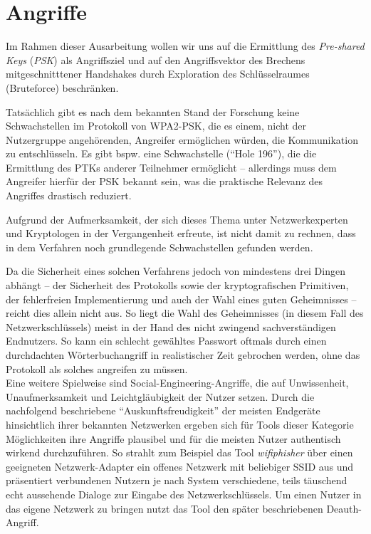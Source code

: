 \section{Angriffe}
Im Rahmen dieser Ausarbeitung wollen wir uns auf die Ermittlung des \textit{Pre-shared Keys} (\textit{PSK}) als Angriffsziel und auf den Angriffsvektor des Brechens mitgeschnitttener Handshakes durch Exploration des Schlüsselraumes (Bruteforce) beschränken.

Tatsächlich gibt es nach dem bekannten Stand der Forschung keine Schwachstellen im Protokoll von WPA2-PSK, die es einem, nicht der Nutzergruppe angehörenden, Angreifer ermöglichen würden, die Kommunikation zu entschlüsseln. Es gibt bspw. eine Schwachstelle (\enquote{Hole 196}), die die Ermittlung des PTKs anderer Teilnehmer ermöglicht -- allerdings muss dem Angreifer hierfür der PSK bekannt sein, was die praktische Relevanz des Angriffes drastisch reduziert.

Aufgrund der Aufmerksamkeit, der sich dieses Thema unter Netzwerkexperten und Kryptologen in der Vergangenheit erfreute, ist nicht damit zu rechnen, dass in dem Verfahren noch grundlegende Schwachstellen gefunden werden. 

Da die Sicherheit eines solchen Verfahrens jedoch von mindestens drei Dingen abhängt -- der Sicherheit des Protokolls sowie der kryptografischen Primitiven, der fehlerfreien Implementierung und auch der Wahl eines guten Geheimnisses -- reicht dies allein nicht aus. 
So liegt die Wahl des Geheimnisses (in diesem Fall des Netzwerkschlüssels) meist in der Hand des nicht zwingend sachverständigen Endnutzers. 
So kann ein schlecht gewähltes Passwort oftmals durch einen durchdachten Wörterbuchangriff in realistischer Zeit gebrochen werden, ohne das Protokoll als solches angreifen zu müssen.\\

Eine weitere Spielweise sind Social-Engineering-Angriffe, die auf Unwissenheit, Unaufmerksamkeit und Leichtgläubigkeit der Nutzer setzen. 
Durch die nachfolgend beschriebene \enquote{Auskunftsfreudigkeit} der meisten Endgeräte hinsichtlich ihrer bekannten Netzwerken ergeben sich für Tools dieser Kategorie Möglichkeiten ihre Angriffe plausibel und für die meisten Nutzer authentisch wirkend durchzuführen.
So strahlt zum Beispiel das Tool \textit{wifiphisher} über einen geeigneten Netzwerk-Adapter ein offenes Netzwerk mit beliebiger SSID aus und präsentiert verbundenen Nutzern je nach System verschiedene, teils täuschend echt aussehende Dialoge zur Eingabe des Netzwerkschlüssels. 
Um einen Nutzer in das eigene Netzwerk zu bringen nutzt das Tool den später beschriebenen Deauth-Angriff. 

